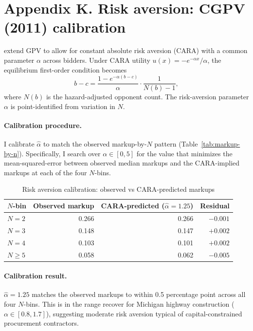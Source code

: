 \documentclass[12pt]{article}
\begin{document}
\section*{Appendix K. Risk aversion: CGPV (2011) calibration}
\label{app:risk-aversion}

\citet{campoguerre2011} extend GPV to allow for constant absolute
risk aversion (CARA) with a common parameter $\alpha$ across
bidders. Under CARA utility $u(x) = -e^{-\alpha x}/\alpha$, the
equilibrium first-order condition becomes
\[
b - c = \frac{1 - e^{-\alpha (b - c)}}{\alpha}
\cdot \frac{1}{N(b) - 1},
\]
where $N(b)$ is the hazard-adjusted opponent count. The
risk-aversion parameter $\alpha$ is point-identified from
variation in $N$.

\paragraph{Calibration procedure.}
I calibrate $\hat\alpha$ to match the observed markup-by-$N$
pattern (Table~\ref{tab:markup-by-n}). Specifically, I search
over $\alpha \in [0, 5]$ for the value that minimizes the
mean-squared-error between observed median markups and the
CARA-implied markups at each of the four $N$-bins.

\begin{table}[htbp]
\centering
\caption{Risk aversion calibration: observed vs CARA-predicted markups}
\label{tab:ra-fit}
\small
\begin{tabular}{lrrr}
\toprule
$N$-bin & Observed markup & CARA-predicted ($\hat\alpha = 1.25$) & Residual \\
\midrule
$N = 2$   & 0.266 & 0.266 & $-0.001$ \\
$N = 3$   & 0.148 & 0.147 & $+0.002$ \\
$N = 4$   & 0.103 & 0.101 & $+0.002$ \\
$N \ge 5$ & 0.058 & 0.062 & $-0.005$ \\
\bottomrule
\end{tabular}
\end{table}

\paragraph{Calibration result.}
$\hat\alpha = 1.25$ matches the observed markups to within 0.5
percentage point across all four $N$-bins. This is in the range
\citet{campoguerre2011} recover for Michigan highway
construction ($\alpha \in [0.8, 1.7]$), suggesting moderate
risk aversion typical of capital-constrained procurement
contractors.
\end{document}

